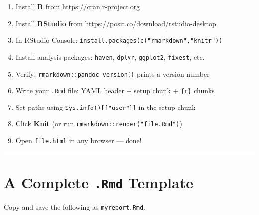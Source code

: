 \documentclass[paper=a4, fontsize=11pt]{scrartcl}
\newcommand{\horrule}[1]{\rule{\linewidth}{#1}}
\begin{document}
\begin{enumerate}
  \item[\(\square\)] Install \textbf{R} from \url{https://cran.r-project.org}
  \item[\(\square\)] Install \textbf{RStudio} from \url{https://posit.co/download/rstudio-desktop}
  \item[\(\square\)] In RStudio Console: \texttt{install.packages(c("rmarkdown","knitr"))}
  \item[\(\square\)] Install analysis packages: \texttt{haven}, \texttt{dplyr}, \texttt{ggplot2}, \texttt{fixest}, etc.
  \item[\(\square\)] Verify: \texttt{rmarkdown::pandoc\_version()} prints a version number
  \item[\(\square\)] Write your \texttt{.Rmd} file: YAML header + setup chunk + \texttt{\{r\}} chunks
  \item[\(\square\)] Set paths using \texttt{Sys.info()[["user"]]} in the setup chunk
  \item[\(\square\)] Click \textbf{Knit} (or run \texttt{rmarkdown::render("file.Rmd")})
  \item[\(\square\)] Open \texttt{file.html} in any browser --- done!
\end{enumerate}

\bigskip\horrule{0.4pt}\bigskip

\section{A Complete \texttt{.Rmd} Template}

Copy and save the following as \texttt{myreport.Rmd}.
\end{document}
